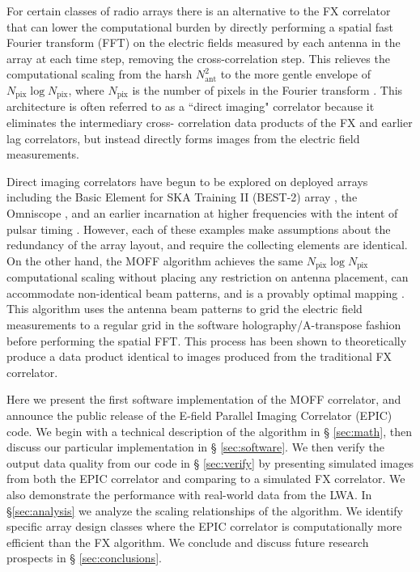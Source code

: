 \documentclass[a4paper,fleqn,usenatbib]{../mnras}
\newcommand{\Nant}{N_{\text{ant}}}
\newcommand{\Npix}{N_{\text{pix}}}
\begin{document}
For certain classes of radio arrays there is an alternative to the FX correlator
that can lower the computational burden by directly performing a spatial fast
Fourier transform (FFT) on the electric fields measured by each antenna in the
array at each time step, removing the cross-correlation step. This relieves the
computational scaling from the harsh $\Nant^2$ to the more gentle envelope of
$\Npix\log\Npix$, where $\Npix$ is the number of pixels in the Fourier transform
\citep[e.g.][]{mor11,teg09,teg10}. This architecture is often referred to as a
``direct imaging" correlator because it eliminates the intermediary cross-
correlation data products of the FX and earlier lag correlators, but instead
directly forms images from the electric field measurements.

Direct imaging correlators have begun to be explored on deployed arrays including
the Basic Element for SKA Training II (BEST-2) array \citep{fos14}, the Omniscope
\citep{zhe14}, and an earlier incarnation at higher frequencies with the intent
of pulsar timing \citep{oto94, dai00}. However, each of these examples make
assumptions about the redundancy of the array layout, and require the collecting
elements are identical. On the other hand, the MOFF algorithm achieves the same
$\Npix \log \Npix$ computational scaling without placing any restriction on
antenna placement, can accommodate non-identical beam patterns, and is a provably
optimal mapping \citep{mor11}. This algorithm uses the antenna beam patterns to
grid the electric field measurements to a regular grid in the software
holography/A-transpose fashion \citep{mor09,bha08,teg97b} before performing the
spatial FFT. This process has been shown to theoretically produce a data product
identical to images produced from the traditional FX correlator.

Here we present the first software implementation of the MOFF correlator, and
announce the public release of the E-field Parallel Imaging Correlator (EPIC)
code. We begin with a technical description of the algorithm in \S
\ref{sec:math}, then discuss our particular implementation in \S
\ref{sec:software}. We then verify the output data quality from our code in \S
\ref{sec:verify} by presenting simulated images from both the EPIC correlator
and comparing to a simulated FX correlator. We also demonstrate the performance
with real-world data from the LWA. In \S \ref{sec:analysis} we analyze the
scaling relationships of the algorithm. We identify specific array design classes
where the EPIC correlator is computationally more efficient than the FX
algorithm. We conclude and discuss future research prospects in \S
\ref{sec:conclusions}.
\end{document}

